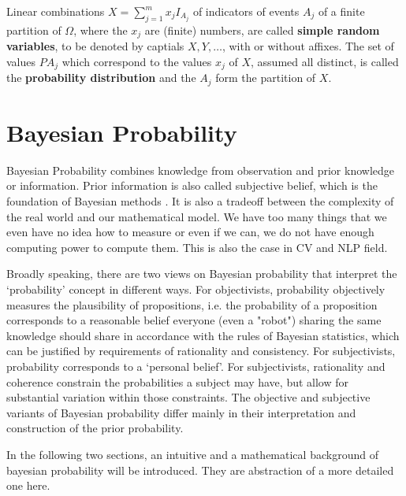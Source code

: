 \documentclass[a4paper]{book}
\begin{document}
  Linear combinations $X = \sum\limits^{m}_{j=1}x_jI_{A_j}$ of
  indicators of events $A_j$ of a finite partition of $\Omega$, where
  the $x_j$ are (finite) numbers, are called \textbf{simple random
    variables}, to be denoted by captials $X, Y, \ldots$, with or
  without affixes. The set of values $PA_j$ which correspond to the
  values $x_j$ of $X$, assumed all distinct, is called the
  \textbf{probability distribution} and the $A_j$ form the partition of
  $X$\cite{1977probability}.

  \section{Bayesian Probability}
  \label{sec:bayesian_probability}

  Bayesian Probability combines knowledge from observation and prior
  knowledge or information. Prior information is also called subjective
  belief, which is the foundation of Bayesian methods
  \cite{hogg2012introduction}. It is also a tradeoff between the
  complexity of the real world and our mathematical model. We have too
  many things that we even have no idea how to measure or even if we
  can, we do not have enough computing power to compute them. This is
  also the case in CV and NLP field.

  Broadly speaking, there are two views on Bayesian probability that
  interpret the `probability' concept in different ways. For objectivists,
  probability objectively measures the plausibility of propositions, i.e.
  the probability of a proposition corresponds to a reasonable belief
  everyone (even a "robot") sharing the same knowledge should share in
  accordance with the rules of Bayesian statistics, which can be justified
  by requirements of rationality and consistency. For subjectivists,
  probability corresponds to a `personal belief'. For subjectivists,
  rationality and coherence constrain the probabilities a subject may
  have, but allow for substantial variation within those constraints. The
  objective and subjective variants of Bayesian probability differ mainly
  in their interpretation and construction of the prior
  probability.\cite{wiki_bayesian_probability}

  In the following two sections, an intuitive and a mathematical
  background of bayesian probability will be introduced. They are
  abstraction of a more detailed one here\cite{murphy2012machine}.
\end{document}
